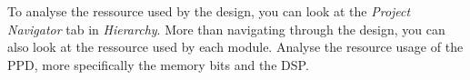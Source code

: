To analyse the ressource used by the design, you can look at the \textit{Project Navigator} tab in \textit{Hierarchy}. More than navigating through the design, you can also look at the ressource used by each module. Analyse the resource usage of the PPD, more specifically the memory bits and the DSP.

